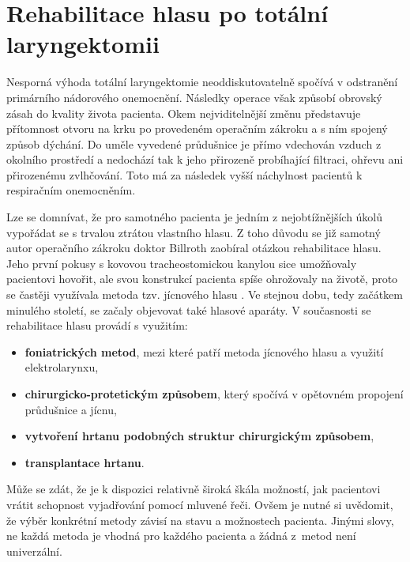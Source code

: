\section{Rehabilitace hlasu po totální laryngektomii}
\label{chap:cause:treatment}

Nesporná výhoda totální laryngektomie neoddiskutovatelně spočívá v odstranění
primárního nádorového onemocnění. Následky operace však způsobí obrovský
zásah do kvality života pacienta. Okem nejviditelnější změnu představuje
přítomnost otvoru na krku po provedeném operačním zákroku a s ním spojený způsob dýchání. 
Do uměle vyvedené průdušnice je přímo vdechován vzduch z okolního prostředí a nedochází tak k jeho přirozeně probíhající filtraci, ohřevu ani přirozenému zvlhčování. Toto má za následek vyšší náchylnost pacientů k respiračním onemocněním.

Lze se domnívat, že pro samotného pacienta je jedním z nejobtížnějších úkolů vypořádat se s trvalou
ztrátou vlastního hlasu. Z toho důvodu se již samotný autor operačního zákroku doktor
Billroth zaobíral otázkou rehabilitace hlasu. Jeho první pokusy s kovovou
tracheostomickou kanylou sice umožňovaly pacientovi hovořit, ale svou
konstrukcí pacienta spíše ohrožovaly na životě, proto se častěji využívala
metoda tzv. jícnového hlasu \cite{Sebova-Sedenkova2006}. Ve stejnou
dobu, tedy začátkem minulého století, se začaly objevovat také %
hlasové aparáty. V současnosti se rehabilitace hlasu provádí s využitím: %

\begin{itemize}
  \item \textbf{foniatrických metod}, mezi které patří metoda jícnového hlasu a využití elektrolarynxu,
  \item \textbf{chirurgicko-protetickým způsobem}, který spočívá v opětovném propojení průdušnice a jícnu,
  \item \textbf{vytvoření hrtanu podobných struktur chirurgickým způsobem},
  \item \textbf{transplantace hrtanu}.
\end{itemize}

\noindent Může se zdát, že je k dispozici relativně široká škála
možností, jak pacientovi vrátit schopnost vyjadřování pomocí mluvené řeči.
Ovšem je nutné si uvědomit, že výběr konkrétní metody závisí na stavu
a možnostech pacienta. Jinými slovy, ne každá metoda je vhodná pro každého pacienta
a žádná z~metod není univerzální.

